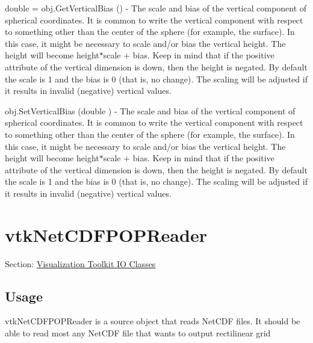\begin{DoxyItemize}
\item {\ttfamily double = obj.\-Get\-Vertical\-Bias ()} -\/ The scale and bias of the vertical component of spherical coordinates. It is common to write the vertical component with respect to something other than the center of the sphere (for example, the surface). In this case, it might be necessary to scale and/or bias the vertical height. The height will become height$\ast$scale + bias. Keep in mind that if the positive attribute of the vertical dimension is down, then the height is negated. By default the scale is 1 and the bias is 0 (that is, no change). The scaling will be adjusted if it results in invalid (negative) vertical values.  
\item {\ttfamily obj.\-Set\-Vertical\-Bias (double )} -\/ The scale and bias of the vertical component of spherical coordinates. It is common to write the vertical component with respect to something other than the center of the sphere (for example, the surface). In this case, it might be necessary to scale and/or bias the vertical height. The height will become height$\ast$scale + bias. Keep in mind that if the positive attribute of the vertical dimension is down, then the height is negated. By default the scale is 1 and the bias is 0 (that is, no change). The scaling will be adjusted if it results in invalid (negative) vertical values.  
\end{DoxyItemize}\hypertarget{vtkio_vtknetcdfpopreader}{}\section{vtk\-Net\-C\-D\-F\-P\-O\-P\-Reader}\label{vtkio_vtknetcdfpopreader}
Section\-: \hyperlink{sec_vtkio}{Visualization Toolkit I\-O Classes} \hypertarget{vtkwidgets_vtkxyplotwidget_Usage}{}\subsection{Usage}\label{vtkwidgets_vtkxyplotwidget_Usage}
vtk\-Net\-C\-D\-F\-P\-O\-P\-Reader is a source object that reads Net\-C\-D\-F files. It should be able to read most any Net\-C\-D\-F file that wants to output rectilinear grid

